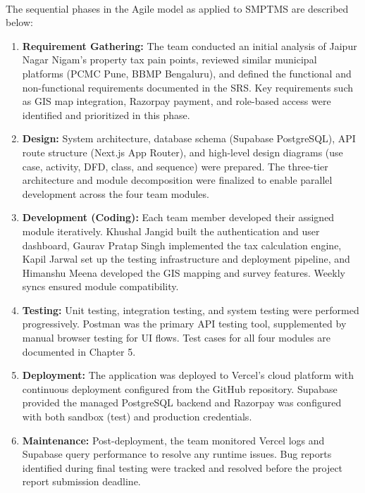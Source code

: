 \paragraph{}The sequential phases in the Agile model as applied to SMPTMS are described below:
\begin{enumerate}
    \item \textbf{Requirement Gathering:} The team conducted an initial analysis of Jaipur Nagar Nigam's property tax pain points, reviewed similar municipal platforms (PCMC Pune, BBMP Bengaluru), and defined the functional and non-functional requirements documented in the SRS. Key requirements such as GIS map integration, Razorpay payment, and role-based access were identified and prioritized in this phase.
    
    \item \textbf{Design:} System architecture, database schema (Supabase PostgreSQL), API route structure (Next.js App Router), and high-level design diagrams (use case, activity, DFD, class, and sequence) were prepared. The three-tier architecture and module decomposition were finalized to enable parallel development across the four team modules.
    
    \item \textbf{Development (Coding):} Each team member developed their assigned module iteratively. Khushal Jangid built the authentication and user dashboard, Gaurav Pratap Singh implemented the tax calculation engine, Kapil Jarwal set up the testing infrastructure and deployment pipeline, and Himanshu Meena developed the GIS mapping and survey features. Weekly syncs ensured module compatibility.
    
    \item \textbf{Testing:} Unit testing, integration testing, and system testing were performed progressively. Postman was the primary API testing tool, supplemented by manual browser testing for UI flows. Test cases for all four modules are documented in Chapter 5.

    \item \textbf{Deployment:} The application was deployed to Vercel's cloud platform with continuous deployment configured from the GitHub repository. Supabase provided the managed PostgreSQL backend and Razorpay was configured with both sandbox (test) and production credentials.

    \item \textbf{Maintenance:} Post-deployment, the team monitored Vercel logs and Supabase query performance to resolve any runtime issues. Bug reports identified during final testing were tracked and resolved before the project report submission deadline.
\end{enumerate}

